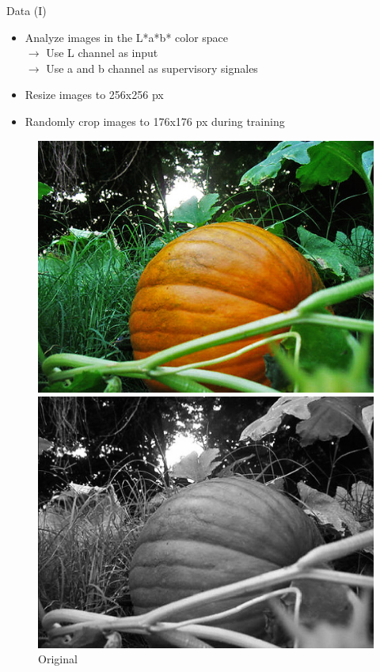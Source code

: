 \documentclass{beamer}
\begin{document}

\begin{frame}{Data (I)}
  \begin{itemize}
    \item Analyze images in the L*a*b* color space \\
          $\rightarrow$ Use L channel as input \\
          $\rightarrow$ Use a and b channel as supervisory signales
    \item Resize images to 256x256 px
    \item Randomly crop images to 176x176 px during training
  \end{itemize}

  \medskip

  \begin{figure}[!htb]
      \includegraphics[width=\linewidth]{resources/pumpkin.jpg}
      \caption{Original}
    \endminipage\hfill
      \includegraphics[width=\linewidth]{resources/pumpkin_bw.jpg}

\end{figure}
\end{frame}
\end{document}
